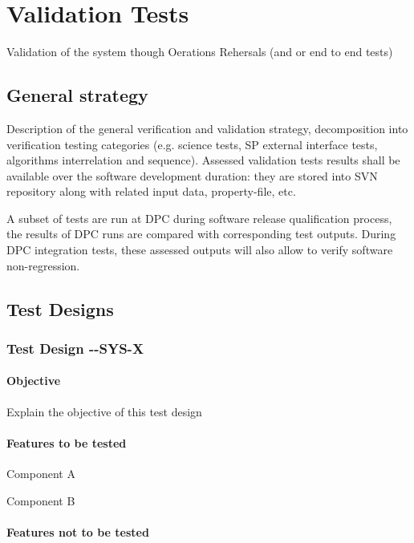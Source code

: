 
\section{Validation Tests}
 Validation of the system though Oerations Rehersals (and or end to end tests)

\subsection{General strategy}

Description of the general verification and validation strategy, decomposition into verification testing categories (e.g. science tests, SP external interface tests, algorithms interrelation and sequence). Assessed validation tests results shall be available over the software development duration: they are stored into SVN repository along with related input data, property-file, etc.

A subset of tests are run at DPC during software release qualification process, the results of DPC runs are compared with corresponding test outputs. During DPC integration tests, these assessed outputs will also allow to verify software non-regression.
 
\subsection{Test Designs}

\subsubsection{Test Design \CU-\product-SYS-X}

\paragraph{Objective}

Explain the objective of this test design

\paragraph{Features to be tested}

\begin{itemize_single}
\item Component A
\item Component B
\end{itemize_single}

\paragraph{Features not to be tested}

